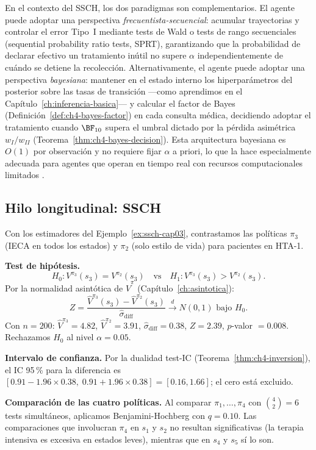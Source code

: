 En el contexto del SSCH, los dos paradigmas son complementarios. El agente puede
adoptar una perspectiva \emph{frecuentista-secuencial}: acumular trayectorias y
controlar el error Tipo~I mediante tests de Wald o tests de rango secuenciales
(sequential probability ratio tests, SPRT), garantizando que la probabilidad de
declarar efectivo un tratamiento inútil no supere $\alpha$ independientemente de
cuándo se detiene la recolección. Alternativamente, el agente puede adoptar una
perspectiva \emph{bayesiana}: mantener en el estado interno los hiperparámetros
del posterior sobre las tasas de transición ---como aprendimos en el
Capítulo~\ref{ch:inferencia-basica}--- y calcular el factor de Bayes
(Definición~\ref{def:ch4-bayes-factor}) en cada consulta médica, decidiendo adoptar
el tratamiento cuando $\BF_{10}$ supera el umbral dictado por la pérdida asimétrica
$w_I/w_{II}$ (Teorema~\ref{thm:ch4-bayes-decision}). Esta arquitectura bayesiana
es $O(1)$ por observación y no requiere fijar $\alpha$ a priori, lo que la hace
especialmente adecuada para agentes que operan en tiempo real con recursos
computacionales limitados \verlanggraph.

\subsection*{Hilo longitudinal: SSCH}

\begin{example}
	\label{ex:ssch-cap04}

	Con los estimadores del Ejemplo~\ref{ex:ssch-cap03}, contrastamos las
	políticas $\pi_3$ (IECA en todos los estados) y $\pi_2$ (solo estilo
	de vida) para pacientes en HTA-1.

	\textbf{Test de hipótesis.}
	\[
		H_0: V^{\pi_3}(s_3) = V^{\pi_2}(s_3) \quad\text{vs}\quad
		H_1: V^{\pi_3}(s_3) > V^{\pi_2}(s_3).
	\]
	Por la normalidad asintótica de $\hat{V}^\pi$ (Capítulo~\ref{ch:asintotica}):
	\[
		Z = \frac{\hat{V}^{\pi_3}(s_3) - \hat{V}^{\pi_2}(s_3)}{\hat\sigma_{\mathrm{diff}}}
		\xrightarrow{d} N(0,1) \text{ bajo } H_0.
	\]
	Con $n=200$: $\hat{V}^{\pi_3}=4.82$, $\hat{V}^{\pi_2}=3.91$,
	$\hat\sigma_{\mathrm{diff}}=0.38$, $Z = 2.39$, $p$\mbox{-valor} $= 0.008$.
	Rechazamos $H_0$ al nivel $\alpha = 0.05$.

	\textbf{Intervalo de confianza.} Por la dualidad test-IC
	(Teorema~\ref{thm:ch4-inversion}), el IC 95\,\% para la diferencia es
	$[0.91 - 1.96 \times 0.38,\; 0.91 + 1.96 \times 0.38] = [0.16, 1.66]$;
	el cero está excluido.

	\textbf{Comparación de las cuatro políticas.} Al comparar $\pi_1,\ldots,\pi_4$
	con $\binom{4}{2} = 6$ tests simultáneos, aplicamos Benjamini-Hochberg
	con $q = 0.10$. Las comparaciones que involucran $\pi_4$ en $s_1$ y $s_2$
	no resultan significativas (la terapia intensiva es excesiva en estados
	leves), mientras que en $s_4$ y $s_5$ sí lo son.
\end{example}


